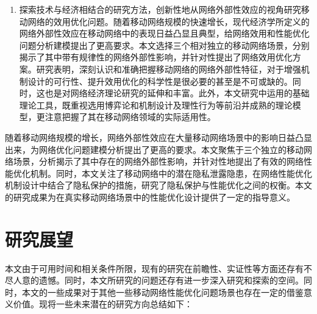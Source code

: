 \begin{enumerate}
 \item 探索技术与经济相结合的研究方法，创新性地从网络外部性效应的视角研究移动网络的效用优化问题。随着移动网络规模的快速增长，现代经济学所定义的网络外部性效应在移动网络中的表现日益凸显且典型，给网络效用和性能优化问题分析建模提出了更高要求。本文选择三个相对独立的移动网络场景，分别揭示了其中带有规律性的网络外部性影响，并针对性提出了网络效用优化方案。研究表明，深刻认识和准确把握移动网络的网络外部性特征，对于增强机制设计的可行性、提升效用优化的科学性是很必要的甚至是不可或缺的。同时，这也是对网络经济理论研究的延伸和丰富。此外，本文研究中运用的基础理论工具，既重视选用博弈论和机制设计及理性行为等前沿并成熟的理论模型，更注意把握了其在移动网络领域的实际适用性。
  
     
\end{enumerate}

随着移动网络规模的增长，网络外部性效应在大量移动网络场景中的影响日益凸显出来，为网络优化问题建模分析提出了更高的要求。本文聚焦于三个独立的移动网络场景，分析揭示了其中存在的网络外部性影响，并针对性地提出了有效的网络性能优化机制。同时，本文关注了移动网络中的潜在隐私泄露隐患，在网络性能优化机制设计中结合了隐私保护的措施，研究了隐私保护与性能优化之间的权衡。本文的研究成果为在真实移动网络场景中的性能优化设计提供了一定的指导意义。

\section{研究展望}
本文由于可用时间和相关条件所限，现有的研究在前瞻性、实证性等方面还存有不尽人意的遗憾。同时，本文所研究的问题还存有进一步深入研究和探索的空间。同时，本文的一些成果对于其他一些移动网络性能优化问题场景也存在一定的借鉴意义价值。现将一些未来潜在的研究方向总结如下：

